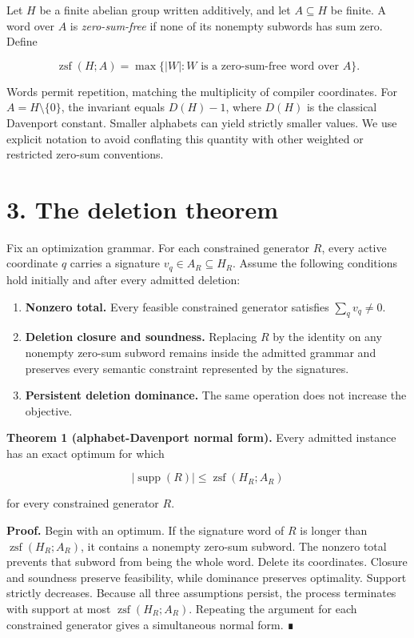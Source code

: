 \documentclass[
  11pt,
]{article}
\providecommand{\tightlist}{%
  \setlength{\itemsep}{0pt}\setlength{\parskip}{0pt}}
\begin{document}
Let \(H\) be a finite abelian group written additively, and let
\(A\subseteq H\) be finite. A word over \(A\) is \emph{zero-sum-free} if
none of its nonempty subwords has sum zero. Define

\[
\operatorname{zsf}(H; A)
=\max\{|W|:W\text{ is a zero-sum-free word over }A\}.
\]

Words permit repetition, matching the multiplicity of compiler
coordinates. For \(A=H\setminus\{0\}\), the invariant equals \(D(H)-1\),
where \(D(H)\) is the classical Davenport constant. Smaller alphabets
can yield strictly smaller values. We use explicit notation to avoid
conflating this quantity with other weighted or restricted zero-sum
conventions.

\hypertarget{the-deletion-theorem}{%
\section{3. The deletion theorem}\label{the-deletion-theorem}}

Fix an optimization grammar. For each constrained generator \(R\), every
active coordinate \(q\) carries a signature \(v_q\in A_R\subseteq H_R\).
Assume the following conditions hold initially and after every admitted
deletion:

\begin{enumerate}
\def\labelenumi{\arabic{enumi}.}
\tightlist
\item
  \textbf{Nonzero total.} Every feasible constrained generator satisfies
  \(\sum_q v_q\ne0\).
\item
  \textbf{Deletion closure and soundness.} Replacing \(R\) by the
  identity on any nonempty zero-sum subword remains inside the admitted
  grammar and preserves every semantic constraint represented by the
  signatures.
\item
  \textbf{Persistent deletion dominance.} The same operation does not
  increase the objective.
\end{enumerate}

\textbf{Theorem 1 (alphabet-Davenport normal form).} Every admitted
instance has an exact optimum for which

\[
|\operatorname{supp}(R)|\le \operatorname{zsf}(H_R; A_R)
\]

for every constrained generator \(R\).

\textbf{Proof.} Begin with an optimum. If the signature word of \(R\) is
longer than \(\operatorname{zsf}(H_R; A_R)\), it contains a nonempty
zero-sum subword. The nonzero total prevents that subword from being the
whole word. Delete its coordinates. Closure and soundness preserve
feasibility, while dominance preserves optimality. Support strictly
decreases. Because all three assumptions persist, the process terminates
with support at most \(\operatorname{zsf}(H_R; A_R)\). Repeating the
argument for each constrained generator gives a simultaneous normal
form. ∎
\end{document}
